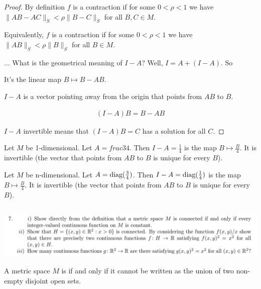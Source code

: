 \documentclass[12pt]{article}
\begin{document}
\begin{enumerate}[label=(\roman*)]
\begin{proof}
    By definition $f$ is a contraction if for some $0 < \rho < 1$ we have
    $\|AB - AC\|_S < \rho\|B - C\|_S$ for all $B, C \in M$.

    Equivalently, $f$ is a contraction if for some $0 < \rho < 1$ we have $\|AB\|_S < \rho\|B\|_S$
    for all $B \in M$.

    ...
    What is the geometrical meaning of $I - A$? Well, $I = A + (I - A)$. So


    It's the linear map $B \mapsto B - AB$.

    $I - A$ is a vector pointing away from the origin that points from $AB$ to $B$.

    \begin{align*}
      (I - A)B = B - AB
    \end{align*}


    $I - A$ invertible means that $(I - A)B = C$ has a solution for all $C$.
  \end{proof}
  \begin{example*}
    Let $M$ be 1-dimensional. Let $A = frac{3}{4}$. Then $I - A = \frac{1}{4}$ is the map
    $B \mapsto \frac{B}{4}$. It is invertible (the vector that points from $AB$ to $B$ is unique
    for every $B$).
  \end{example*}

  \begin{example*}
    Let $M$ be n-dimensional. Let $A = \operatorname{\text{diag}}(\frac{3}{4})$. Then $I - A = \operatorname{\text{diag}}(\frac{1}{4})$ is the
    map $B \mapsto \frac{B}{4}$. It is invertible (the vector that points from $AB$ to $B$ is
    unique for every $B$).
  \end{example*}

\end{enumerate}


\subsection{}


\begin{mdframed}
\includegraphics[width=400pt]{img/oxford-a2-2-7.png}
\end{mdframed}

\begin{definition*}
  A metric space $M$ is  if and only if it cannot be written as the union of two
  non-empty disjoint open sets.
\end{definition*}
\end{document}
